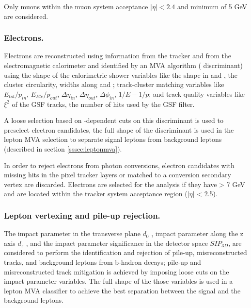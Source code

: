 Only muons within the muon system acceptance $|\eta| < 2.4$ and minimum \pt  of 5 GeV are considered. %

\subsubsection*{Electrons.}

Electrons are reconstructed using information from the tracker and from the electromagnetic calorimeter and identified by an MVA algorithm ( discriminant) using the shape of the calorimetric shower variables like the shape in \etac and \phic, the cluster circularity, widths along \etac and \phic; track-cluster matching variables like $E_{tot}/p_{in}$, $E_{Ele}/p_{out}$, $\Delta \eta_{in}$,  $\Delta \eta_{out}$, $\Delta \phi_{in}$, $1/E - 1/p$; and track quality variables like $\xi^2$ of the GSF tracks, the number of hits used by the GSF filter\cite{mva_eid}.

A loose selection based on \etac-dependent cuts on this discriminant is used to preselect electron candidates, the full shape of the discriminant is used in the lepton MVA selection to separate signal leptons from background leptons (described in section \ref{sssec:leptonmva}).

In order to reject electrons from photon conversions, electron candidates with missing hits in the pixel tracker layers or matched to a conversion secondary vertex are discarded. Electrons are selected for the analysis if they have \pt > 7 GeV and are located within the tracker system acceptance region ($|\eta|$ < 2.5). %

\subsubsection*{Lepton vertexing and pile-up rejection.}

The impact parameter in the transverse plane $d_0$ , impact parameter along the z axis $d_z$ , and the impact parameter significance in the detector space $SIP_{3D}$, are considered to perform the identification and rejection of pile-up, misreconstructed tracks, and background leptons from b-hadron decays; pile-up and misreconstructed track mitigation is achieved by imposing loose cuts on the impact parameter variables. The full shape of the those variables is used in a lepton MVA classifier to achieve the best separation between the signal and the background leptons.

